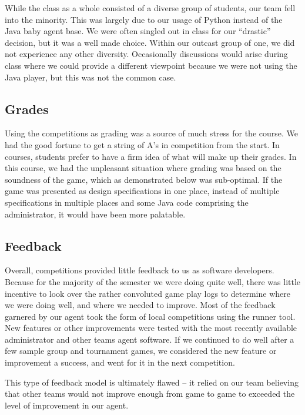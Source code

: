 \documentclass[letterpaper,12pt,oneside]{article}
\begin{document}
While the class as a whole consisted of a diverse group of students, our team
fell into the minority. This was largely due to our usage of Python instead of
the Java baby agent base. We were often singled out in class for our
``drastic'' decision, but it was a well made choice. Within our outcast group
of one, we did not experience any other diversity. Occasionally discussions
would arise during class where we could provide a different viewpoint because
we were not using the Java player, but this was not the common case.

\subsection{Grades}

Using the competitions as grading was a source of much stress for the course.
We had the good fortune to get a string of A's in competition from the start.
In courses, students prefer to have a firm idea of what will make up their
grades. In this course, we had the unpleasant situation where grading was based
on the soundness of the game, which as demonstrated below was sub-optimal. If
the game was presented as design specifications in one place, instead of
multiple specifications in multiple places and some Java code comprising the
administrator, it would have been more palatable.

\subsection{Feedback}
Overall, competitions provided little feedback to us as software developers.
Because for the majority of the semester we were doing quite well, there was
little incentive to look over the rather convoluted game play logs to
determine where we were doing well, and where we needed to improve. Most of the
feedback garnered by our agent took the form of local competitions using the
runner tool. New features or other improvements were tested with the most
recently available administrator and other teams agent software. If we
continued to do well after a few sample group and tournament games, we
considered the new feature or improvement a success, and went for it in the
next competition.

This type of feedback model is ultimately flawed -- it relied on our team
believing that other teams would not improve enough from game to game to 
exceeded the level of improvement in our agent. 
\end{document}
